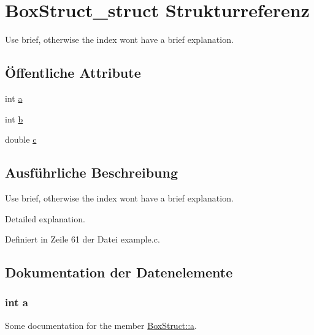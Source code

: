 \hypertarget{struct_box_struct__struct}{}\section{Box\+Struct\+\_\+struct Strukturreferenz}
\label{struct_box_struct__struct}


Use brief, otherwise the index won\textquotesingle{}t have a brief explanation.  


\subsection*{Öffentliche Attribute}
\begin{DoxyCompactItemize}
\item 
int \hyperlink{struct_box_struct__struct_aa4c2a5552e9bc49b1816ff532f558c74}{a}
\item 
int \hyperlink{struct_box_struct__struct_a148e3876077787926724625411d6e7a9}{b}
\item 
double \hyperlink{struct_box_struct__struct_a2c09e929a6ea340fc9653cca414b11d3}{c}
\end{DoxyCompactItemize}


\subsection{Ausführliche Beschreibung}
Use brief, otherwise the index won\textquotesingle{}t have a brief explanation. 

Detailed explanation. 

Definiert in Zeile 61 der Datei example.\+c.



\subsection{Dokumentation der Datenelemente}
\hypertarget{struct_box_struct__struct_aa4c2a5552e9bc49b1816ff532f558c74}{}
\subsubsection[{a}]{\setlength{\rightskip}{0pt plus 5cm}int a}\label{struct_box_struct__struct_aa4c2a5552e9bc49b1816ff532f558c74}
Some documentation for the member \hyperlink{struct_box_struct__struct_aa4c2a5552e9bc49b1816ff532f558c74}{Box\+Struct\+::a}. 

